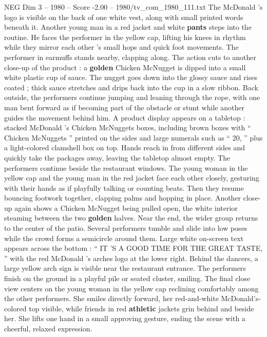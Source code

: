 \begin{textsample}{NEG Dim 3 – 1980 – Score -2.00 – 1980/tv\_com\_1980\_111.txt}
The McDonald ’s logo is visible on the back of one white vest, along with small printed words beneath it.
Another young man in a red jacket and white \textbf{pants} steps into the routine.
He faces the performer in the yellow cap, lifting his knees in rhythm while they mirror each other ’s small hops and quick foot movements.
The performer in earmuffs stands nearby, clapping along.
The action cuts to another close-up of the product : a \textbf{golden} Chicken McNugget is dipped into a small white plastic cup of sauce.
The nugget goes down into the glossy sauce and rises coated ; thick sauce stretches and drips back into the cup in a slow ribbon.
Back outside, the performers continue jumping and leaning through the rope, with one man bent forward as if becoming part of the obstacle or stunt while another guides the movement behind him.
A product display appears on a tabletop : stacked McDonald ’s Chicken McNuggets boxes, including brown boxes with “ Chicken McNuggets ” printed on the sides and large numerals such as “ 20, ” plus a light-colored clamshell box on top.
Hands reach in from different sides and quickly take the packages away, leaving the tabletop almost empty.
The performers continue beside the restaurant windows.
The young woman in the yellow cap and the young man in the red jacket face each other closely, gesturing with their hands as if playfully talking or counting beats.
Then they resume bouncing footwork together, clapping palms and hopping in place.
Another close-up again shows a Chicken McNugget being pulled open, the white interior steaming between the two \textbf{golden} halves.
Near the end, the wider group returns to the center of the patio.
Several performers tumble and slide into low poses while the crowd forms a semicircle around them.
Large white on-screen text appears across the bottom : “ IT ’S A GOOD TIME FOR THE GREAT TASTE, ” with the red McDonald ’s arches logo at the lower right.
Behind the dancers, a large yellow arch sign is visible near the restaurant entrance.
The performers finish on the ground in a playful pile or seated cluster, smiling.
The final close view centers on the young woman in the yellow cap reclining comfortably among the other performers.
She smiles directly forward, her red-and-white McDonald’s-colored top visible, while friends in red \textbf{athletic} jackets grin behind and beside her.
She lifts one hand in a small approving gesture, ending the scene with a cheerful, relaxed expression.

\end{textsample}
